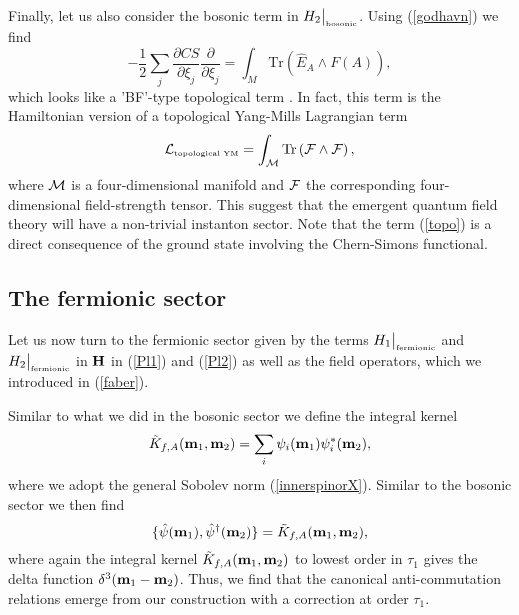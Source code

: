 \documentclass[letterpaper,11pt]{article}
\def\d{\delta}
\def\cf{{\cal F}}
\def\cl{{\cal L}}
\def\cm{{\cal M}}
\newcommand{\pa}{\partial}
\begin{document}
Finally, let us also consider the bosonic term in $H_2\big\vert_{\mbox{\tiny bosonic}}$.  Using (\ref{godhavn})  we find
\begin{equation}
-\frac{1}{2}\sum_j \frac{\pa CS}{\pa \xi_j}   \frac{\pa }{\pa \xi_j}  = \int_M \mbox{Tr} \left( \hat{E}_A \wedge F(A) \right),
\label{topo}
\end{equation}
which looks like a 'BF'-type topological term \cite{Birmingham}. In fact, this term is the Hamiltonian version of a topological Yang-Mills Lagrangian term \cite{Witten:1988ze} 
$$
\cl_{\mbox{\tiny topological YM}} = \int_{\cm}\mbox{Tr} \left( \cf \wedge \cf \right),
$$
where $\cm$ is a four-dimensional manifold and $\cf$ the corresponding four-dimensional field-strength tensor. This suggest that the emergent quantum field theory will have a non-trivial instanton sector. Note that the term (\ref{topo}) is a direct consequence of the ground state involving the Chern-Simons functional. 





\subsection{The fermionic sector }


Let us now turn to the fermionic sector given by the terms $H_1\big\vert_{\mbox{\tiny fermionic}}$ and $H_2\big\vert_{\mbox{\tiny fermionic}}$ in ${\bf H}$ in (\ref{Pl1}) and (\ref{Pl2}) as well as the field operators, which we introduced in (\ref{faber}). 

Similar to what we did in the bosonic sector we define the integral kernel
\begin{equation}
\tilde{K}_{f,A}({\bf m}_1,{\bf m}_2)= \sum_i \psi_i({\bf m}_1)\psi^*_i({\bf m}_2),
\label{Capetown}
\end{equation}
where we adopt the general Sobolev norm (\ref{innerspinorX}). Similar to the bosonic sector  we then find
\begin{equation}
\{ \hat{\psi} ({\bf m}_1) ,   \hat{{\psi}}^\dagger ({\bf m}_2) \} = \tilde{K}_{f,A}({\bf m}_1,{\bf m}_2),
\label{Fermionic}
\end{equation}
where again the integral kernel $\tilde{K}_{f,A}({\bf m}_1,{\bf m}_2)$ to lowest order in $\tau_1$ gives the delta function $\d^3({\bf m}_1-{\bf m}_2)$. Thus, we find that the canonical anti-commutation relations emerge from our construction with a correction at order $\tau_1$.
\end{document}
